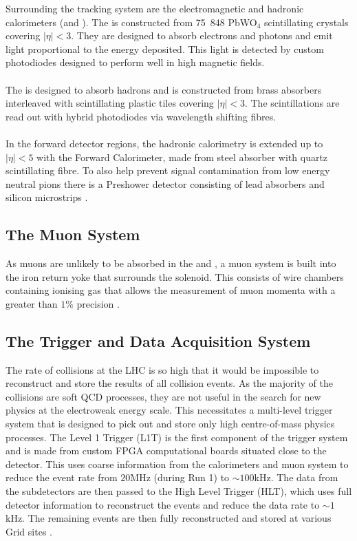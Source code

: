 Surrounding
the tracking system are the electromagnetic and hadronic calorimeters
(\ECAL and \HCAL). The \ECAL is constructed from 75~848 PbWO$_4$
scintillating crystals covering $|\eta|<3$. They are designed to
absorb electrons and photons and emit light proportional to the energy
deposited. This light is detected by custom photodiodes designed to
perform well in high magnetic fields.  \\\\ The \HCAL is designed to
absorb hadrons and is constructed from brass absorbers interleaved
with scintillating plastic tiles covering $|\eta|<3$. The
scintillations are read out with hybrid photodiodes via wavelength
shifting fibres.  \\\\ In the forward detector regions, the hadronic
calorimetry is extended up to $|\eta|<5$ with the Forward Calorimeter,
made from steel absorber with quartz scintillating fibre. To also help
prevent signal contamination from low energy neutral pions there is a
Preshower detector consisting of lead absorbers and silicon
microstrips \cite{CMSTechDesign1DetectorPerformance}\cite{Cutajar}.

\subsection{The Muon System} As muons are unlikely to be absorbed in
the \ECAL and \HCAL, a muon system is built into the iron return yoke
that surrounds the solenoid.  This consists of wire chambers
containing ionising gas that allows the measurement of muon momenta
with a greater than $1\%$ precision
\cite{CMS_Overview_Chatrchyan:2008aa}.

\subsection{The Trigger and Data Acquisition System}
\label{sec:triggers} The rate of collisions at the LHC is so high that
it would be impossible to reconstruct and store the results of all
collision events. As the majority of the collisions are soft QCD
processes, they are not useful in the search for new physics at the
electroweak energy scale. This necessitates a multi-level trigger
system that is designed to pick out and store only high centre-of-mass
physics processes. The Level 1 Trigger (L1T) is the first component of
the trigger system and is made from custom FPGA computational boards
situated close to the detector. This uses coarse information from the
calorimeters and muon system to reduce the event rate from $20$MHz
(during Run 1) to $\sim100$kHz. The data from the subdetectors are
then passed to the High Level Trigger (HLT), which uses full detector
information to reconstruct the events and reduce the data rate to
$\sim1$kHz. The remaining events are then fully reconstructed and
stored at various Grid sites \cite{GridTechDesign}.



